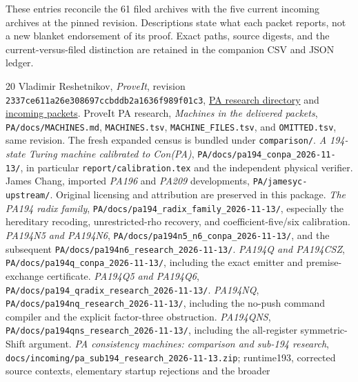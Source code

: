 \documentclass[11pt,letterpaper]{article}
\newcommand{\file}[1]{\texttt{\nolinkurl{#1}}}
\begin{document}
These entries reconcile the 61 filed archives with the five current incoming
archives at the pinned revision. Descriptions state what each packet reports,
not a new blanket endorsement of its proof. Exact paths, source digests,
and the current-versus-filed distinction are retained in the companion CSV
and JSON ledger.
{\small}

\clearpage
\begin{thebibliography}{20}
 Vladimir Reshetnikov, \emph{ProveIt}, revision
\nolinkurl{2337ce611a26e308697ccbddb2a1636f989f01c3},
\href{https://github.com/VladimirReshetnikov/ProveIt/tree/2337ce611a26e308697ccbddb2a1636f989f01c3/Computability/BusyBeaver/Research/PA}{PA research directory}
and \href{https://github.com/VladimirReshetnikov/ProveIt/tree/2337ce611a26e308697ccbddb2a1636f989f01c3/docs/incoming}{incoming packets}.
 ProveIt PA research, \emph{Machines in the delivered packets},
\file{PA/docs/MACHINES.md}, \file{MACHINES.tsv}, \file{MACHINE_FILES.tsv},
and \file{OMITTED.tsv}, same revision. The fresh expanded census is bundled
under \file{comparison/}.
 \emph{A 194-state Turing machine calibrated to Con(PA)},
\file{PA/docs/pa194_conpa_2026-11-13/}, in particular
\file{report/calibration.tex} and the independent physical verifier.
 James Chang, imported \emph{PA196} and \emph{PA209}
developments, \file{PA/jamesyc-upstream/}. Original licensing and attribution
are preserved in this package.
 \emph{The PA194 radix family},
\file{PA/docs/pa194_radix_family_2026-11-13/}, especially the hereditary
recoding, unrestricted-rho recovery, and coefficient-five/six calibration.
 \emph{PA194N5 and PA194N6},
\file{PA/docs/pa194n5_n6_conpa_2026-11-13/}, and the subsequent
\file{PA/docs/pa194n6_research_2026-11-13/}.
 \emph{PA194Q and PA194CSZ},
\file{PA/docs/pa194q_conpa_2026-11-13/}, including the exact emitter and
premise-exchange certificate.
 \emph{PA194Q5 and PA194Q6},
\file{PA/docs/pa194_qradix_research_2026-11-13/}.
 \emph{PA194NQ},
\file{PA/docs/pa194nq_research_2026-11-13/}, including the no-push command
compiler and the explicit factor-three obstruction.
 \emph{PA194QNS},
\file{PA/docs/pa194qns_research_2026-11-13/}, including the all-register
symmetric-Shift argument.
 \emph{PA consistency machines: comparison and sub-194 research},
\file{docs/incoming/pa_sub194_research_2026-11-13.zip}; runtime193,
corrected source contexts, elementary startup rejections and the broader

\end{thebibliography}
\end{document}
